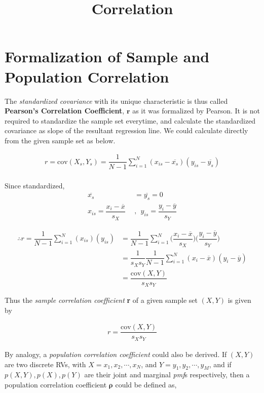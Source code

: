 \documentclass[tikz = true, float=false, crop=false, 11pt]{standalone}
\title{Correlation}
\begin{document}
 
	
	\section{Formalization of Sample and Population Correlation}
	
	The \textit{standardized covariance} with its unique characteristic is thus called \textbf{Pearson's Correlation Coefficient}, $\mathbf{r}$ as it was formalized by Pearson. It is not required to standardize the sample set everytime, and calculate the standardized covariance as slope of the resultant regression line. We could calculate directly from the given sample set as below.  
	
	$$\begin{aligned}
	r = \mathrm{cov}(X_s, Y_s)  = \dfrac{1}{N-1}\sum_{i=1}^N (x_{is} - \overline{x_s}) (y_{is} - \overline{y_s}) \\  
	\end{aligned}$$
	
	Since standardized, 
	$$\begin{aligned}
	\overline{x_s} &= \overline{y_s} = 0  \\	
	x_{is} = \dfrac{x_i - \overline{x}}{s_X} \ \ &, \ \ y_{is} = \dfrac{y_i - \overline{y}}{s_Y}
	\end{aligned}$$
	
	$$\begin{aligned}
	\therefore r =  \dfrac{1}{N-1}\sum_{i=1}^N (x_{is})(y_{is}) &=  \dfrac{1}{N-1}\sum_{i=1}^N \bigg( \dfrac{x_i - \overline{x}}{s_X} \bigg)\bigg( \dfrac{y_i - \overline{y}}{s_Y} \bigg) \\
	&= \dfrac{1}{s_X s_Y} \dfrac{1}{N-1} \sum_{i=1}^N (x_i - \overline{x})(y_i - \overline{y}) \\
	&= \dfrac{\mathrm{cov}(X, Y)}{s_X s_Y} 
	\end{aligned}$$
	
	Thus the \textit{sample correlation coefficient} \textbf{r} of a given sample set $(X,Y)$ is given by
	
	$$\begin{aligned}
	r = \dfrac{\mathrm{cov}(X,Y)}{s_X s_Y}
	\end{aligned}$$
	
	By analogy, a \textit{population correlation coefficient} could also be derived. If $(X,Y)$ are two discrete RVs, with $X = x_1, x_2, \cdots, x_N$, and $Y = y_1, y_2,\cdots, y_M$, and if $p(X,Y), p(X), p(Y)$ are their joint and marginal \textit{pmf}s respectively, then a population correlation coefficient $\mathbf{\rho}$ could be defined as, 
	
\end{document}
